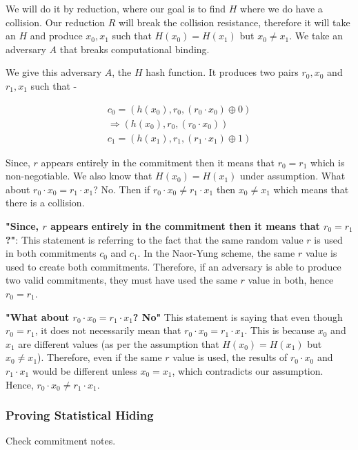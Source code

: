 \documentclass{article}
\begin{document}
We will do it by reduction, where our goal is to find $H$ where we do have a collision. Our reduction $R$ will break the collision resistance, therefore it will take an $H$ and produce $x_0, x_1$ such that $H(x_0) = H(x_1)$ but $x_0 \neq x_1$. We take an adversary $A$ that breaks computational binding.

We give this adversary $A$, the $H$ hash function. It produces two pairs $r_0, x_0$ and $r_1, x_1$ such that -

\begin{align*}
    c_0 = (h(x_0), r_0, (r_0 \cdot x_0) \oplus 0) \\
    \Rightarrow (h(x_0), r_0, (r_0 \cdot x_0)) \\
    c_1 = (h(x_1), r_1, (r_1 \cdot x_1) \oplus 1)
\end{align*}

Since, $r$ appears entirely in the commitment then it means that $r_0 = r_1$ which is non-negotiable. We also know that $H(x_0) = H(x_1)$ under assumption. What about $r_0 \cdot x_0 = r_1 \cdot x_1$? No. Then if $r_0 \cdot x_0 \neq r_1 \cdot x_1$ then $x_0 \neq x_1$ which means that there is a collision.


\textbf{"Since, $r$ appears entirely in the commitment then it means that $r_0 = r_1$?"}: This statement is referring to the fact that the same random value $r$ is used in both commitments $c_0$ and $c_1$. In the Naor-Yung scheme, the same $r$ value is used to create both commitments. Therefore, if an adversary is able to produce two valid commitments, they must have used the same $r$ value in both, hence $r_0 = r_1$.

\textbf{"What about $r_0 \cdot x_0 = r_1 \cdot x_1$? No"} This statement is saying that even though $r_0 = r_1$, it does not necessarily mean that $r_0 \cdot x_0 = r_1 \cdot x_1$. This is because $x_0$ and $x_1$ are different values (as per the assumption that $H(x_0) = H(x_1)$ but $x_0 \neq x_1$). Therefore, even if the same $r$ value is used, the results of $r_0 \cdot x_0$ and $r_1 \cdot x_1$ would be different unless $x_0 = x_1$, which contradicts our assumption. Hence, $r_0 \cdot x_0 \neq r_1 \cdot x_1$.
   
\subsubsection{Proving Statistical Hiding}

Check commitment notes.

% 
% 
\end{document}
